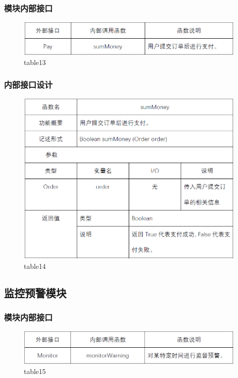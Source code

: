 \subsubsection{模块内部接口}
\begin{figure}[!htb]
	\centering
	\includegraphics[scale=1]{image/b13.png} %
	\caption{table13} %
\end{figure}
\subsubsection{内部接口设计}
\begin{figure}[!htb]
	\centering
	\includegraphics[scale=1]{image/b14.png} %
	\caption{table14} %
\end{figure}
\subsection{监控预警模块}
\subsubsection{模块内部接口}
\begin{figure}[!htb]
	\centering
	\includegraphics[scale=1]{image/b15.png} %
	\caption{table15} %
\end{figure}
